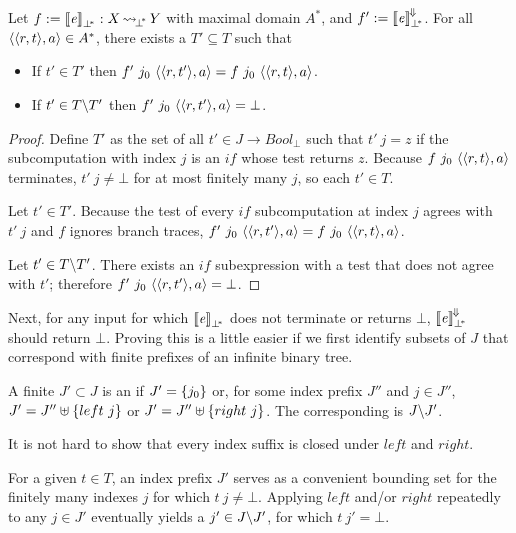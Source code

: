 \begin{theorem}
Let $f := \left\llbracket{\mathit{e}}\right\rrbracket_{\bot^{\mspace{-4mu}*}} : X \operatorname{\rightsquigarrow_{\mspace{-3mu}{\bot^{\mspace{-4mu}*}}}} Y$ with maximal domain $A^*$, and $f' := \left\llbracket{\mathit{e}}\right\rrbracket^{\mspace{-2mu}\Downarrow\mspace{-2mu}}_{\bot^{\mspace{-4mu}*}}$.
For all $\langle{\langle{r,t}\rangle,a}\rangle \in A^*$, there exists a $T' \subseteq T$ such that
\begin{itemize}
	\item If $t' \in T'$ then $f'~j_0~\langle{\langle{r,t'}\rangle,a}\rangle = f~j_0~\langle{\langle{r,t}\rangle,a}\rangle$.
	\item If $t' \in T \backslash T'$ then $f'~j_0~\langle{\langle{r,t'}\rangle,a}\rangle = \bot$.
\end{itemize}
\end{theorem}
\begin{proof}
Define $T'$ as the set of all $t' \in J \to Bool_\bot$ such that $t'~j = z$ if the subcomputation with index $j$ is an $if$ whose test returns $z$.
Because $f~j_0~\langle{\langle{r,t}\rangle,a}\rangle$ terminates, $t'~j \neq \bot$ for at most finitely many $j$, so each $t' \in T$.

Let $t' \in T'$.
Because the test of every $if$ subcomputation at index $j$ agrees with $t'~j$ and $f$ ignores branch traces, $f'~j_0~\langle{\langle{r,t'}\rangle,a}\rangle = f~j_0~\langle{\langle{r,t}\rangle,a}\rangle$.

Let $t' \in T \backslash T'$.
There exists an $if$ subexpression with a test that does not agree with $t'$; therefore $f'~j_0~\langle{\langle{r,t'}\rangle,a}\rangle = \bot$.
\end{proof}

Next, for any input for which $\left\llbracket{\mathit{e}}\right\rrbracket_{\bot^{\mspace{-4mu}*}}$ does not terminate or returns $\bot$, $\left\llbracket{\mathit{e}}\right\rrbracket^{\mspace{-2mu}\Downarrow\mspace{-2mu}}_{\bot^{\mspace{-4mu}*}}$ should return $\bot$.
Proving this is a little easier if we first identify subsets of $J$ that correspond with finite prefixes of an infinite binary tree.

\begin{definition}
\label{def:index-prefix}
A finite $J' \subset J$ is an  if $J' = \{{j_0}\}$ or, for some index prefix $J''$ and $j \in J''$, $J' = J'' \uplus \{{left~j}\}$ or $J' = J'' \uplus \{{right~j}\}$.
The corresponding  is $J \backslash J'$.
\end{definition}

It is not hard to show that every index suffix is closed under $left$ and $right$.

For a given $t \in T$, an index prefix $J'$ serves as a convenient bounding set for the finitely many indexes $j$ for which $t~j \neq \bot$.
Applying $left$ and/or $right$ repeatedly to any $j \in J'$ eventually yields a $j' \in J \backslash J'$, for which $t~j' = \bot$.

